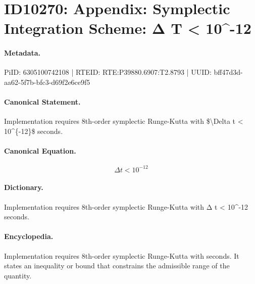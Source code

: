 \section*{ID10270: Appendix: Symplectic Integration Scheme: Δ T < 10\textasciicircum{}-12}
\paragraph{Metadata.}
PiID: 6305100742108 | RTEID: RTE:P39880.6907:T2.8793 | UUID: bff47d3d-aa62-5f7b-bfc3-d69f2e6ce9f5

\paragraph{Canonical Statement.}
Implementation requires 8th-order symplectic Runge-Kutta with \$\textbackslash{}Delta t < 10\textasciicircum{}\{-12\}\$ seconds.

\paragraph{Canonical Equation.}
\[
\Delta t < 10^{-12}
\]

\paragraph{Dictionary.}
Implementation requires 8th-order symplectic Runge-Kutta with Δ t < 10\textasciicircum{}-12 seconds.

\paragraph{Encyclopedia.}
Implementation requires 8th-order symplectic Runge-Kutta with seconds. It states an inequality or bound that constrains the admissible range of the quantity.
